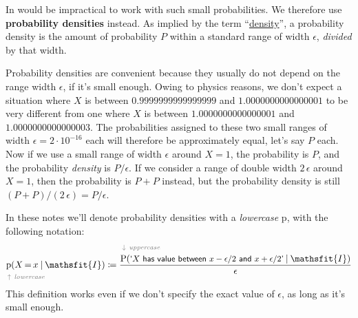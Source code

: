 \documentclass[
  a4paper,
  DIV=11,
  numbers=noendperiod,
  oneside]{scrreprt}
\begin{document}
In would be impractical to work with such small probabilities. We
therefore use {\textbf{probability densities}} instead. As implied by
the term
``\href{https://www.nist.gov/pml/special-publication-811/nist-guide-si-chapter-8}{density}'',
a probability density is the amount of probability \(P\) within a
standard range of width \(\epsilon\), \emph{divided} by that width.

Probability densities are convenient because they usually do not depend
on the range width \(\epsilon\), if it's small enough. Owing to physics
reasons, we don't expect a situation where \(X\) is between
{\(0.9999999999999999\)} and {\(1.0000000000000001\)} to be very
different from one where \(X\) is between {\(1.0000000000000001\)} and
{\(1.0000000000000003\)}. The probabilities assigned to these two small
ranges of width \(\epsilon=2\cdot 10^{-16}\) each will therefore be
approximately equal, let's say \(P\) each. Now if we use a small range
of width \(\epsilon\) around \(X=1\), the probability is \(P\), and the
probability \emph{density} is \(P/\epsilon\). If we consider a range of
double width \(2\,\epsilon\) around \(X=1\), then the probability is
\(P+P\) instead, but the probability density is still
\((P+P)/(2\,\epsilon) = P/\epsilon\).

In these notes we'll denote probability densities with a
{\emph{lowercase} \(\mathrm{p}\)}, with the following notation: \[
\underbracket[0ex]{\mathrm{p}}_{\mathrlap{\color[RGB]{119,119,119}\!\uparrow\ \textit{lowercase}}}(X\mathord{\,=\,}x \nonscript\:\vert\nonscript\:\mathopen{} \mathsfit{I}) \coloneqq
\frac{
\overbracket[0ex]{\mathrm{P}}^{\mathrlap{\color[RGB]{119,119,119}\!\downarrow\ \textit{uppercase}}}(\textsf{\small`\(X\) has value between \(x-\epsilon/2\) and \(x+\epsilon/2\)'} \nonscript\:\vert\nonscript\:\mathopen{} \mathsfit{I})
}{\epsilon}
\] This definition works even if we don't specify the exact value of
\(\epsilon\), as long as it's small enough.
\end{document}
